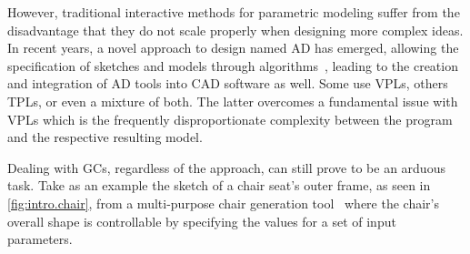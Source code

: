 However, traditional interactive methods for parametric modeling suffer from the
disadvantage that they do not scale properly when designing more complex ideas.
In recent years, a novel approach to design named \ac{AD} has emerged, allowing
the specification of sketches and models through
algorithms~\cite{McCormack:2004:GDPDR}, leading to the creation and integration
of \ac{AD} tools into \ac{CAD} software as well.  Some use \acp{VPL},
others \acp{TPL}, or even a mixture of both.  The latter overcomes a fundamental
issue with \acp{VPL} which is the frequently disproportionate complexity between
the program and the respective resulting model.

Dealing with \acp{GC}, regardless of the approach, can still prove to be an
arduous task.  Take as an example the sketch of a chair seat's outer frame, as
seen in \cref{fig:intro.chair}, from a multi-purpose chair generation
tool~\cite{Garcia:2012:ChairDNA} where the chair's overall shape is controllable
by specifying the values for a set of input parameters.

